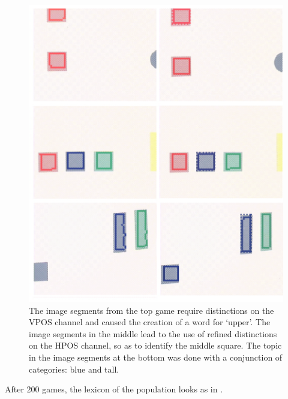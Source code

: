 \begin{figure}
\begin{center}
\includegraphics[width=0.8\columnwidth]{chap7/figs/plate-15-vpos}
\end{center}
\caption{ The image segments from the top game require 
distinctions on the VPOS channel and 
caused the creation of a word for `upper'. The image 
segments in the middle lead to the use of refined
distinctions on the HPOS channel, so as to 
identify the middle square. The topic in the 
image segments at the bottom was done with a 
conjunction of categories: blue and tall.}
\label{fig:plate-15}
\end{figure}

After 200 games, the lexicon of the population looks as in . 

